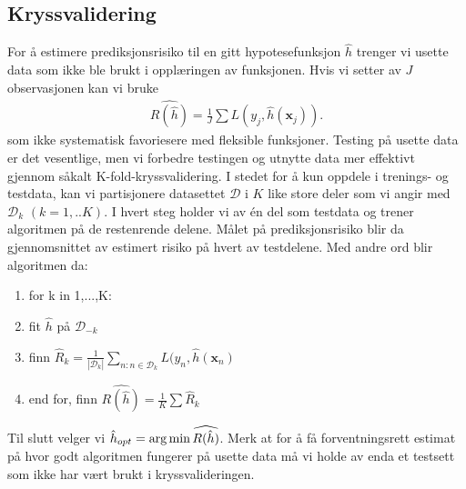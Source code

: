 \subsection{Kryssvalidering}
For å estimere prediksjonsrisiko til en gitt hypotesefunksjon $\hat{h}$ trenger vi usette data som ikke ble brukt i opplæringen av funksjonen. Hvis vi setter av $J$ observasjonen kan vi bruke
\begin{align}
\widehat{R(\hat{h})} = \frac{1}{J}\sum L(y_j,\hat{h}(\mathbf{x}_j)).
\end{align}
som ikke systematisk favoriesere med fleksible funksjoner. Testing på usette data er det vesentlige, men vi forbedre testingen og utnytte data mer effektivt gjennom såkalt K-fold-kryssvalidering. I stedet for å kun oppdele i trenings- og testdata, kan vi partisjonere datasettet $\mathcal{D}$ i $K$ like store deler som vi angir med $\mathcal{D}_k$ $(k=1,..K)$. I hvert steg holder vi av én del som testdata og trener algoritmen på de restenrende delene. Målet på prediksjonsrisiko blir da gjennomsnittet av estimert risiko på hvert av testdelene. Med andre ord blir algoritmen da:
\begin{enumerate}
\item for k in 1,...,K:
\item fit $\hat{h}$ på $\mathcal{D}_{-k}$
\item finn $\hat{R}_k = \frac{1}{|\mathcal{D}_k|}\sum_{n:n\in\mathcal{D}_k}L(y_n,\hat{h}(\mathbf{x}_n)$
\item end for, finn $\widehat{R(\hat{h})}=\frac{1}{K}\sum \hat{R}_k$
\end{enumerate}
Til slutt velger vi $\hat{h}_{opt} = \operatorname*{arg\,min} \widehat{R(\hat{h})}$. Merk at for å få forventningsrett estimat på hvor godt algoritmen fungerer på usette data må vi holde av enda et testsett som ikke har vært brukt i kryssvalideringen.
